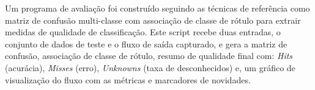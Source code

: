 





Um programa de avaliação foi construído seguindo as técnicas de referência como
matriz de confusão multi-classe com associação de classe de rótulo
\cite{Faria2016minas} para extrair medidas de qualidade de classificação.
Este script recebe duas entradas, o conjunto de dados de teste e o fluxo de
saída capturado, e gera a matriz de confusão, associação de classe de rótulo,
resumo de qualidade final com:
\emph{Hits} (acurácia), \emph{Misses} (erro), \emph{Unknowns} (taxa de
desconhecidos) e, um gráfico de visualização do fluxo com as métricas e
marcadores de novidades.

